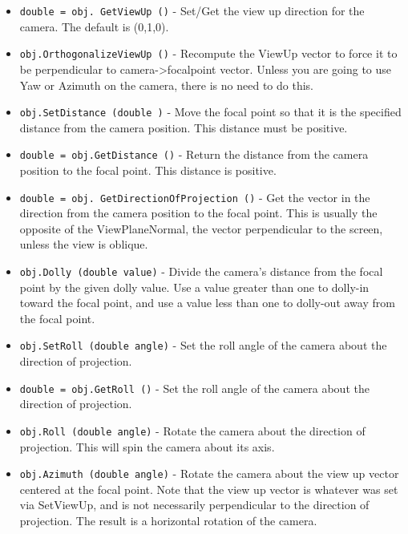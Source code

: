 \begin{itemize}
\item  \verb|double = obj. GetViewUp ()| -  Set/Get the view up direction for the camera.  The default
 is (0,1,0).

\item  \verb|obj.OrthogonalizeViewUp ()| -  Recompute the ViewUp vector to force it to be perpendicular to
 camera->focalpoint vector.  Unless you are going to use
 Yaw or Azimuth on the camera, there is no need to do this.

\item  \verb|obj.SetDistance (double )| -  Move the focal point so that it is the specified distance from
 the camera position.  This distance must be positive.

\item  \verb|double = obj.GetDistance ()| -  Return the distance from the camera position to the focal point.
 This distance is positive.

\item  \verb|double = obj. GetDirectionOfProjection ()| -  Get the vector in the direction from the camera position to the
 focal point.  This is usually the opposite of the ViewPlaneNormal,
 the vector perpendicular to the screen, unless the view is oblique.

\item  \verb|obj.Dolly (double value)| -  Divide the camera's distance from the focal point by the given
 dolly value.  Use a value greater than one to dolly-in toward
 the focal point, and use a value less than one to dolly-out away
 from the focal point.

\item  \verb|obj.SetRoll (double angle)| -  Set the roll angle of the camera about the direction of projection.

\item  \verb|double = obj.GetRoll ()| -  Set the roll angle of the camera about the direction of projection.

\item  \verb|obj.Roll (double angle)| -  Rotate the camera about the direction of projection.  This will
 spin the camera about its axis.

\item  \verb|obj.Azimuth (double angle)| -  Rotate the camera about the view up vector centered at the focal point.
 Note that the view up vector is whatever was set via SetViewUp, and is
 not necessarily perpendicular to the direction of projection.  The
 result is a horizontal rotation of the camera.


\end{itemize}
